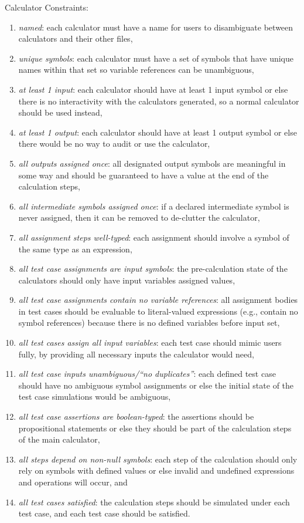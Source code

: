 \documentclass[11pt,fleqn]{article}
\begin{document}
\noindent{}Calculator Constraints:
\begin{enumerate}
  \item \textit{named}: each calculator must have a name for users to
        disambiguate between calculators and their other files,
  \item \textit{unique symbols}: each calculator must have a set of symbols that
        have unique names within that set so variable references can be
        unambiguous,
  \item \textit{at least 1 input}: each calculator should have at least 1 input
        symbol or else there is no interactivity with the calculators generated,
        so a normal calculator should be used instead,
  \item \textit{at least 1 output}: each calculator should have at least 1
        output symbol or else there would be no way to audit or use the
        calculator,
  \item \textit{all outputs assigned once}: all designated output symbols are
        meaningful in some way and should be guaranteed to have a value at the
        end of the calculation steps,
  \item \textit{all intermediate symbols assigned once}: if a declared
        intermediate symbol is never assigned, then it can be removed to
        de-clutter the calculator,
  \item \textit{all assignment steps well-typed}: each assignment should involve
        a symbol of the same type as an expression,
  \item \textit{all test case assignments are input symbols}: the
        pre-calculation state of the calculators should only have input
        variables assigned values,
  \item \textit{all test case assignments contain no variable references}: all
        assignment bodies in test cases should be evaluable to literal-valued
        expressions (e.g., contain no symbol references) because there is no
        defined variables before input set,
  \item \textit{all test cases assign all input variables}: each test case
        should mimic users fully, by providing all necessary inputs the
        calculator would need,
  \item \textit{all test case inputs unambiguous/``no duplicates''}: each
        defined test case should have no ambiguous symbol assignments or else
        the initial state of the test case simulations would be ambiguous,
  \item \textit{all test case assertions are boolean-typed}: the assertions
        should be propositional statements or else they should be part of the
        calculation steps of the main calculator,
  \item \textit{all steps depend on non-null symbols}: each step of the
        calculation should only rely on symbols with defined values or else
        invalid and undefined expressions and operations will occur, and
  \item \textit{all test cases satisfied}: the calculation steps should be
        simulated under each test case, and each test case should be satisfied.
\end{enumerate}
\end{document}
